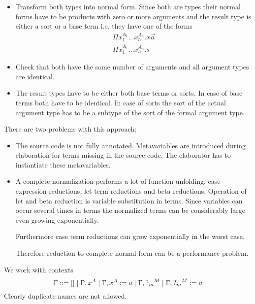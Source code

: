 \begin{itemize}

    \item Transform both types into normal form. Since both are types their normal
        forms have to be products with zero or more arguments and the result type is
        either a sort or a base term i.e. they have one of the forms
        $$
        \begin{array}{l}
            \Pi x_1^{A_1} \ldots x_n^{A_n}. x \vec a
            \\
            \Pi x_1^{A_1} \ldots x_n^{A_n}. s
        \end{array}
        $$

    \item Check that both have the same number of arguments and  all argument types
        are identical.

    \item The result types have to be either both base terms or sorts. In case of
        base terms both have to be identical. In case of sorts the sort of the actual
        argument type has to be a subtype of the sort of the formal argument type.

\end{itemize}


There are two problems with this approach:

\begin{itemize}

    \item The source code is not fully annotated. Metavariables are introduced
        during elaboration for terms missing in the source code. The elaborator
        has to instantiate these metavariables.

    \item A complete normalization performs a lot of function unfolding, case
        expression reductions, let term reductions and beta reductions.
        Operation of let and beta reduction is variable substitution in terms.
        Since variables can occur several times in terms the normalized terms
        can be considerably large even growing exponentially.

        Furthermore case term reductions can grow exponentially in the worst
        case.

        Therefore reduction to complete normal form can be a performance
        problem.
\end{itemize}


We work with contexts
$$
    \Gamma ::= [] \mid \Gamma,x^A \mid \Gamma, x^A := a \mid \Gamma, {?_{m}}^M
                \mid \Gamma, {?_{m}}^M := a
$$
Clearly duplicate names are not allowed.

